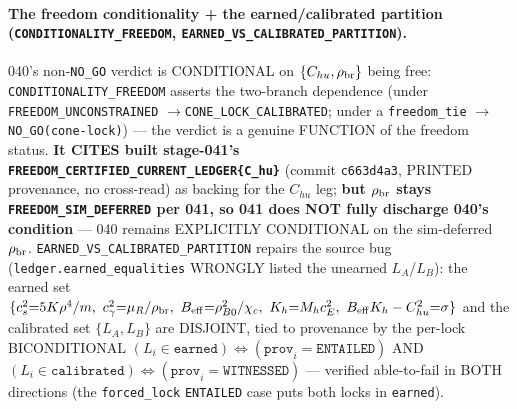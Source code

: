 \paragraph{The freedom conditionality + the earned/calibrated partition (\texttt{CONDITIONALITY\_FREEDOM}, \texttt{EARNED\_VS\_CALIBRATED\_PARTITION}).}
040's non-\texttt{NO\_GO} verdict is CONDITIONAL on \(\{C_{hu},\rho_{\rm br}\}\)
being free: \texttt{CONDITIONALITY\_FREEDOM} asserts the two-branch dependence
(under \texttt{FREEDOM\_UNCONSTRAINED} \(\to\)\texttt{CONE\_LOCK\_CALIBRATED};
under a \texttt{freedom\_tie} \(\to\)\texttt{NO\_GO(cone-lock)}) --- the verdict is
a genuine FUNCTION of the freedom status. \textbf{It CITES built stage-041's
\texttt{FREEDOM\_CERTIFIED\_CURRENT\_LEDGER\{C\_hu\}}} (commit \texttt{c663d4a3},
PRINTED provenance, no cross-read) as backing for the \(C_{hu}\) leg; \textbf{but
\(\rho_{\rm br}\) stays \texttt{FREEDOM\_SIM\_DEFERRED} per 041, so 041 does NOT
fully discharge 040's condition} --- 040 remains EXPLICITLY CONDITIONAL on the
sim-deferred \(\rho_{\rm br}\). \texttt{EARNED\_VS\_CALIBRATED\_PARTITION} repairs
the source bug (\texttt{ledger.earned\_equalities} WRONGLY listed the unearned
\(L_A\)/\(L_B\)): the earned set
\(\{c_s^2{=}5K\rho^4/m,\ c_\gamma^2{=}\mu_R/\rho_{\rm br},\
B_{\rm eff}{=}\rho_{B0}^2/\chi_c,\ K_h{=}M_h c_E^2,\
B_{\rm eff}K_h-C_{hu}^2{=}\sigma\}\) and the calibrated set \(\{L_A,L_B\}\) are
DISJOINT, tied to provenance by the per-lock BICONDITIONAL
\((L_i\in\texttt{earned})\Leftrightarrow(\texttt{prov}_i{=}\texttt{ENTAILED})\) AND
\((L_i\in\texttt{calibrated})\Leftrightarrow(\texttt{prov}_i{=}\texttt{WITNESSED})\)
--- verified able-to-fail in BOTH directions (the \texttt{forced\_lock}
\texttt{ENTAILED} case puts both locks in \texttt{earned}).

